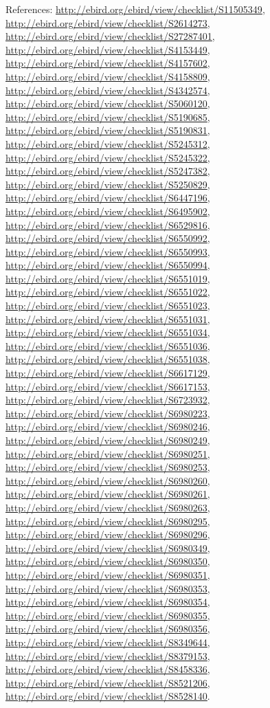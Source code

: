 \documentclass[9pt, article]{memoir}
\begin{document}
\begin{multicols}{2}
\vspace{6pt}References: 
\url{http://ebird.org/ebird/view/checklist/S11505349}, 
\url{http://ebird.org/ebird/view/checklist/S2614273}, 
\url{http://ebird.org/ebird/view/checklist/S27287401}, 
\url{http://ebird.org/ebird/view/checklist/S4153449}, 
\url{http://ebird.org/ebird/view/checklist/S4157602}, 
\url{http://ebird.org/ebird/view/checklist/S4158809}, 
\url{http://ebird.org/ebird/view/checklist/S4342574}, 
\url{http://ebird.org/ebird/view/checklist/S5060120}, 
\url{http://ebird.org/ebird/view/checklist/S5190685}, 
\url{http://ebird.org/ebird/view/checklist/S5190831}, 
\url{http://ebird.org/ebird/view/checklist/S5245312}, 
\url{http://ebird.org/ebird/view/checklist/S5245322}, 
\url{http://ebird.org/ebird/view/checklist/S5247382}, 
\url{http://ebird.org/ebird/view/checklist/S5250829}, 
\url{http://ebird.org/ebird/view/checklist/S6447196}, 
\url{http://ebird.org/ebird/view/checklist/S6495902}, 
\url{http://ebird.org/ebird/view/checklist/S6529816}, 
\url{http://ebird.org/ebird/view/checklist/S6550992}, 
\url{http://ebird.org/ebird/view/checklist/S6550993}, 
\url{http://ebird.org/ebird/view/checklist/S6550994}, 
\url{http://ebird.org/ebird/view/checklist/S6551019}, 
\url{http://ebird.org/ebird/view/checklist/S6551022}, 
\url{http://ebird.org/ebird/view/checklist/S6551023}, 
\url{http://ebird.org/ebird/view/checklist/S6551031}, 
\url{http://ebird.org/ebird/view/checklist/S6551034}, 
\url{http://ebird.org/ebird/view/checklist/S6551036}, 
\url{http://ebird.org/ebird/view/checklist/S6551038}, 
\url{http://ebird.org/ebird/view/checklist/S6617129}, 
\url{http://ebird.org/ebird/view/checklist/S6617153}, 
\url{http://ebird.org/ebird/view/checklist/S6723932}, 
\url{http://ebird.org/ebird/view/checklist/S6980223}, 
\url{http://ebird.org/ebird/view/checklist/S6980246}, 
\url{http://ebird.org/ebird/view/checklist/S6980249}, 
\url{http://ebird.org/ebird/view/checklist/S6980251}, 
\url{http://ebird.org/ebird/view/checklist/S6980253}, 
\url{http://ebird.org/ebird/view/checklist/S6980260}, 
\url{http://ebird.org/ebird/view/checklist/S6980261}, 
\url{http://ebird.org/ebird/view/checklist/S6980263}, 
\url{http://ebird.org/ebird/view/checklist/S6980295}, 
\url{http://ebird.org/ebird/view/checklist/S6980296}, 
\url{http://ebird.org/ebird/view/checklist/S6980349}, 
\url{http://ebird.org/ebird/view/checklist/S6980350}, 
\url{http://ebird.org/ebird/view/checklist/S6980351}, 
\url{http://ebird.org/ebird/view/checklist/S6980353}, 
\url{http://ebird.org/ebird/view/checklist/S6980354}, 
\url{http://ebird.org/ebird/view/checklist/S6980355}, 
\url{http://ebird.org/ebird/view/checklist/S6980356}, 
\url{http://ebird.org/ebird/view/checklist/S8349644}, 
\url{http://ebird.org/ebird/view/checklist/S8379153}, 
\url{http://ebird.org/ebird/view/checklist/S8458336}, 
\url{http://ebird.org/ebird/view/checklist/S8521206}, 
\url{http://ebird.org/ebird/view/checklist/S8528140}.


\end{multicols}
\end{document}
